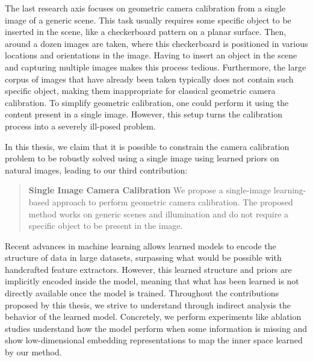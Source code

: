 The last research axis focuses on geometric camera calibration from a single image of a generic scene. This task usually requires some specific object to be inserted in the scene, like a checkerboard pattern on a planar surface. Then, around a dozen images are taken, where this checkerboard is positioned in various locations and orientations in the image. Having to insert an object in the scene and capturing multiple images makes this process tedious. Furthermore, the large corpus of images that have already been taken typically does not contain such specific object, making them inappropriate for classical geometric camera calibration. To simplify geometric calibration, one could perform it using the content present in a single image. However, this setup turns the calibration process into a severely ill-posed problem. 

In this thesis, we claim that it is possible to constrain the camera calibration problem to be robustly solved using a single image using learned priors on natural images, leading to our third contribution: 

\begin{quotation}
\textbf{Single Image Camera Calibration} We propose a single-image learning-based approach to perform geometric camera calibration. The proposed method works on generic scenes and illumination and do not require a specific object to be present in the image. 
\end{quotation}

Recent advances in machine learning allows learned models to encode the structure of data in large datasets, surpassing what would be possible with handcrafted feature extractors. However, this learned structure and priors are implicitly encoded inside the model, meaning that what has been learned is not directly available once the model is trained. Throughout the contributions proposed by this thesis, we strive to understand through indirect analysis the behavior of the learned model. Concretely, we perform experiments like ablation studies understand how the model perform when some information is missing and show low-dimensional embedding representations to map the inner space learned by our method.


